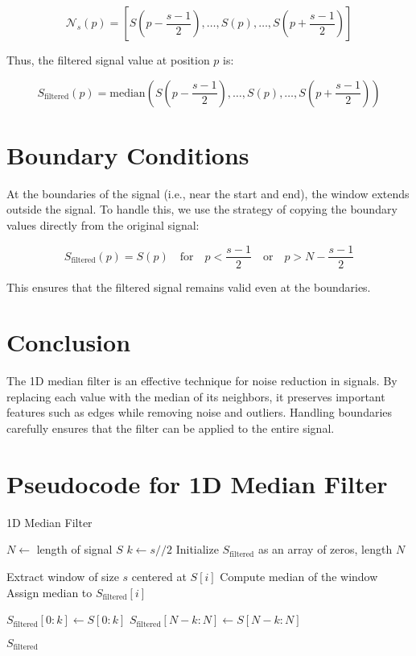 \documentclass{article}
\begin{document}
\[
\mathcal{N}_s(p) = \left[ S\left(p - \frac{s-1}{2}\right), \dots, S(p), \dots, S\left(p + \frac{s-1}{2}\right) \right]
\]

Thus, the filtered signal value at position \( p \) is:

\[
S_{\text{filtered}}(p) = \text{median} \left( S\left(p - \frac{s-1}{2}\right), \dots, S(p), \dots, S\left(p + \frac{s-1}{2}\right) \right)
\]

\section{Boundary Conditions}
At the boundaries of the signal (i.e., near the start and end), the window extends outside the signal. To handle this, we use the strategy of copying the boundary values directly from the original signal:

\[
S_{\text{filtered}}(p) = S(p) \quad \text{for} \quad p < \frac{s-1}{2} \quad \text{or} \quad p > N - \frac{s-1}{2}
\]

This ensures that the filtered signal remains valid even at the boundaries.

\section{Conclusion}
The 1D median filter is an effective technique for noise reduction in signals. By replacing each value with the median of its neighbors, it preserves important features such as edges while removing noise and outliers. Handling boundaries carefully ensures that the filter can be applied to the entire signal.





\section*{Pseudocode for 1D Median Filter}

\begin{algorithm}
\caption{1D Median Filter}
\begin{algorithmic}[1]
    \State $N \gets$ length of signal $S$
    \State $k \gets s // 2$  
    \State Initialize $S_{\text{filtered}}$ as an array of zeros, length $N$
    
        \State Extract window of size $s$ centered at $S[i]$
        \State Compute median of the window
        \State Assign median to $S_{\text{filtered}}[i]$
    \EndFor
    
    \State $S_{\text{filtered}}[0:k] \gets S[0:k]$
    \State $S_{\text{filtered}}[N-k:N] \gets S[N-k:N]$
    
    \State \Return $S_{\text{filtered}}$
\EndProcedure
\end{algorithmic}
\end{algorithm}
\end{document}
